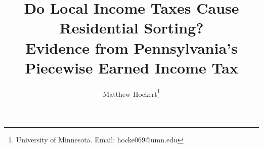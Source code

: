 \documentclass[12pt]{article}
\title{Do Local Income Taxes Cause Residential
Sorting? \\
\large Evidence from Pennsylvania's Piecewise Earned Income Tax}
\author{Matthew Hockert\thanks{University of Minnesota. Email: hocke069@umn.edu}}
\begin{document}
\maketitle

\begin{abstract}

\end{abstract}
\end{document}
